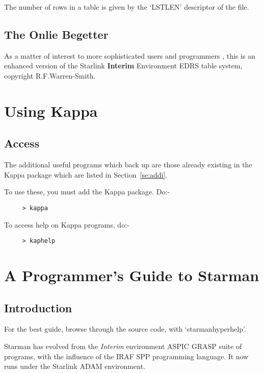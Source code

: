 The number of rows in a table is given by the `LSTLEN' descriptor of
the file.

\subsection{The Onlie Begetter}

As a matter of interest to more sophisticated users and programmers ,
this is an enhanced version of the Starlink {\bf Interim} Environment
EDRS table system, copyright R.F.Warren-Smith.





\section{Using Kappa } \label{se:packs}

\subsection{Access}

The additional useful programs which back up \starman are those already
existing in the Kappa package which are listed in
Section~\ref{se:addi}.

To use these, you must add the Kappa package. Do:-

\begin{verbatim}
     > kappa \end{verbatim}

To access help on Kappa programs, do:-

\begin{verbatim}
     > kaphelp \end{verbatim}



\section { A Programmer's Guide to Starman}

\subsection{Introduction}

For the best guide, browse through the source code, with
`starmanhyperhelp'.

Starman has evolved from the {\it Interim} environment ASPIC GRASP
suite of programs, with the influence of the IRAF SPP programming
language.  It now runs under the Starlink ADAM environment.

